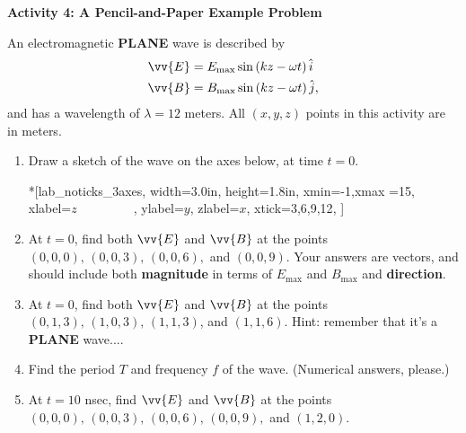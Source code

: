 \pagebreak[2]


\textbf{Activity 4: A Pencil-and-Paper Example Problem}

An electromagnetic \textbf{PLANE} wave is described by
\begin{align*}
\vv {E} &= E_\text{max} \sin \left ( kz - \omega t \right ) \hat i\\
\vv {B} &= B_\text{max} \sin \left ( kz - \omega t \right ) \hat j,
\end{align*}
and has a wavelength of $\lambda =12$ meters.  All $(x,y,z)$ points in this activity are in meters.

\begin{enumerate}[labparts]
\item Draw a sketch of the wave on the axes below, at time $t=0$.

\begin{lab_axis}*[lab_noticks_3axes,
	width={3.0in}, height={1.8in},
	xmin=-1,xmax =15,
	xlabel={$z$~~~~~~~~~},  %
	ylabel=$y$,
	zlabel=$x$,
	xtick={3,6,9,12},
	]
\end{lab_axis}
\answerspace{0.1in}

\item At $t=0$, find both $\vv {E}$ and $\vv {B}$ at the points $(0,0,0), \,(0,0,3), \,(0,0,6),$ and $(0,0,9)$.  Your answers are vectors, and should include both \textbf{magnitude} in terms of $E_\text{max}$ and $B_\text{max}$ and \textbf{direction}.  
\answerspace{1.0in}

\item At $t=0$, find both $\vv {E}$ and $\vv {B}$ at the points $(0,1,3), \,(1,0,3), \,(1,1,3)$, and $(1,1,6)$.  Hint: remember that it's a \textbf{PLANE} wave....
\answerspace{1.0in}

\item Find the period $T$ and frequency $f$ of the wave.  (Numerical answers, please.)
\answerspace{1.0in}

\item At $t=10$ nsec, find $\vv {E}$ and $\vv {B}$ at the points $(0,0,0), \,(0,0,3), \,(0,0,6), \,(0,0,9),$ and $(1,2,0)$.  
\answerspace{1.0in}
\end{enumerate}


